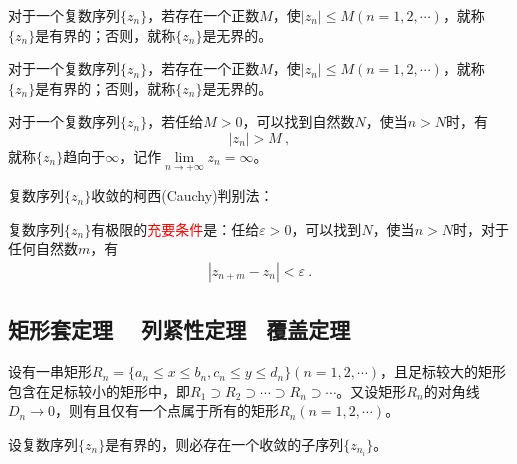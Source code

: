 \documentclass[11pt,a4paper]{article}
\begin{document}
\begin{tcolorbox}[colback=green!5,colframe=green!40!black,title= 定义]
对于一个复数序列$\{z_n \}$，若存在一个正数$M$，使$|z_n| \leqslant M (n = 1, 2, \cdots)$，就称$\{z_n \}$是有界的；否则，就称$\{z_n \}$是无界的。
\end{tcolorbox}

\begin{tcolorbox}[colback=green!5,colframe=green!40!black,title= 定义]
对于一个复数序列$\{z_n \}$，若存在一个正数$M$，使$|z_n| \leqslant M (n = 1, 2, \cdots)$，就称$\{z_n \}$是有界的；否则，就称$\{z_n \}$是无界的。
\end{tcolorbox}


\begin{tcolorbox}[colback=green!5,colframe=green!40!black,title= 定义]
对于一个复数序列$\{z_n \}$，若任给$M > 0$，可以找到自然数$N$，使当$n > N$时，有
\begin{equation*}
|z_n| > M ~,
\end{equation*}
就称$\{z_n \}$趋向于$\infty$，记作$\underset{n\rightarrow +\infty}\lim z_n = \infty$。
\end{tcolorbox}

复数序列$\{z_n \}$收敛的柯西(Cauchy)判别法：
\begin{tcolorbox}[colback=green!5,colframe=green!40!black,title= 定理]
复数序列$\{z_n \}$有极限的\textcolor{red}{充要条件}是：任给$\varepsilon > 0$，可以找到$N$，使当$n > N$时，对于任何自然数$m$，有
\begin{align*}
|z_{n+m} - z_n| < \varepsilon  ~. 
\end{align*}
\end{tcolorbox}


\subsection{矩形套定理 ~ 列紧性定理 ~覆盖定理}
\begin{tcolorbox}[colback=green!5,colframe=green!40!black,title= 矩形套定理]
设有一串矩形$R_n = \{ a_n \leqslant x \leqslant b_n, c_n \leqslant y \leqslant d_n \} (n = 1, 2, \cdots)$，且足标较大的矩形包含在足标较小的矩形中，即$R_1 \supset R_2 \supset \cdots \supset R_n \supset \cdots$。又设矩形$R_n$的对角线$D_n \rightarrow 0$，则有且仅有一个点属于所有的矩形$R_n (n = 1, 2, \cdots)$。
\end{tcolorbox}


\begin{tcolorbox}[colback=green!5,colframe=green!40!black,title= 列紧性定理]
设复数序列$\{z_n \}$是有界的，则必存在一个收敛的子序列$\{z_{n_i} \}$。
\end{tcolorbox}
\end{document}
